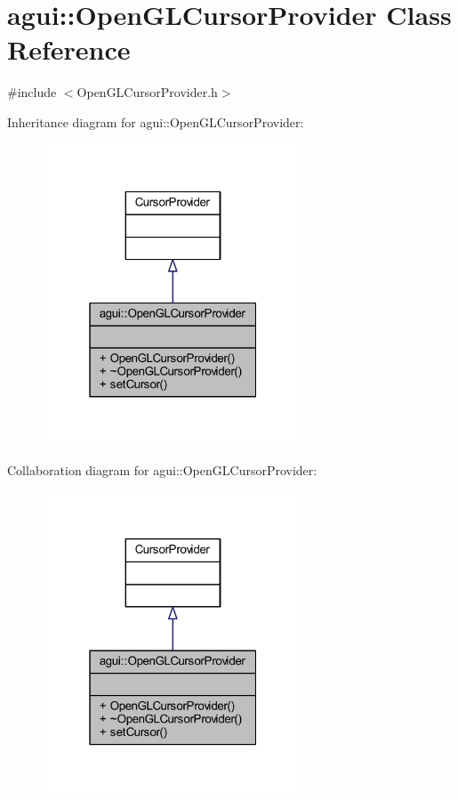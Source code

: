 \hypertarget{classagui_1_1_open_g_l_cursor_provider}{}\section{agui\+:\+:Open\+G\+L\+Cursor\+Provider Class Reference}
\label{classagui_1_1_open_g_l_cursor_provider}


{\ttfamily \#include $<$Open\+G\+L\+Cursor\+Provider.\+h$>$}



Inheritance diagram for agui\+:\+:Open\+G\+L\+Cursor\+Provider\+:
\nopagebreak
\begin{figure}[H]
\begin{center}
\leavevmode
\includegraphics[width=220pt]{classagui_1_1_open_g_l_cursor_provider__inherit__graph}
\end{center}
\end{figure}


Collaboration diagram for agui\+:\+:Open\+G\+L\+Cursor\+Provider\+:
\nopagebreak
\begin{figure}[H]
\begin{center}
\leavevmode
\includegraphics[width=220pt]{classagui_1_1_open_g_l_cursor_provider__coll__graph}
\end{center}
\end{figure}

